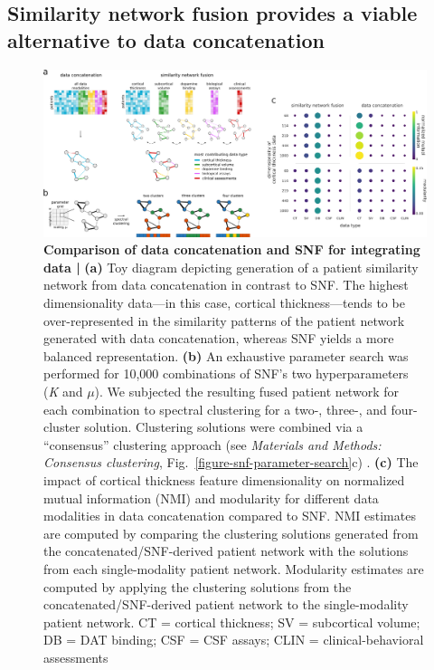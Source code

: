 \documentclass[12pt,aps,pra,reprint,showkeys]{revtex4-1}
\begin{document}
\subsection*{Similarity network fusion provides a viable alternative to data concatenation}

\begin{figure}[htp]
  \begin{center}
    \centerline{\includegraphics[width=1.0\textwidth]{data_concatenation.pdf}}
    \caption{
      \textbf{Comparison of data concatenation and SNF for integrating data |}
      \textbf{(a)} Toy diagram depicting generation of a patient similarity network from data concatenation in contrast to SNF.
      The highest dimensionality data---in this case, cortical thickness---tends to be over-represented in the similarity patterns of the patient network generated with data concatenation, whereas SNF yields a more balanced representation.
      \textbf{(b)} An exhaustive parameter search was performed for 10,000 combinations of SNF's two hyperparameters (\emph{K} and $\mu$).
      We subjected the resulting fused patient network for each combination to spectral clustering for a two-, three-, and four-cluster solution.
      Clustering solutions were combined via a ``consensus'' clustering approach (see \emph{Materials and Methods: Consensus clustering}, Fig.~\ref{figure-snf-parameter-search}c) \citep{bassett2013robust, lancichinetti2012consensus}.
      \textbf{(c)} The impact of cortical thickness feature dimensionality on normalized mutual information (NMI) and modularity for different data modalities in data concatenation compared to SNF.
      NMI estimates are computed by comparing the clustering solutions generated from the concatenated/SNF-derived patient network with the solutions from each single-modality patient network.
      Modularity estimates are computed by applying the clustering solutions from the concatenated/SNF-derived patient network to the single-modality patient network.
      CT = cortical thickness; SV = subcortical volume; DB = DAT binding; CSF = CSF assays; CLIN = clinical-behavioral assessments
    }
    \label{figure-data-concatenation}
  \end{center}
\end{figure}
\end{document}
